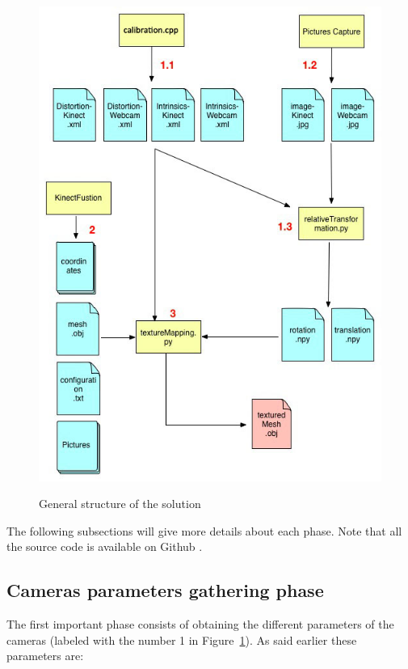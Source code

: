 \begin{figure}
\caption{General structure of the solution}
\centering
    \includegraphics[width=1.0\textwidth]{images/workflow.jpg}
\label{fig:workflow}
\end{figure}

The following subsections will give more details about each phase. Note that all the source code is available on Github \cite{github}.

\subsection{Cameras parameters gathering phase}
\label{sec:Cameras parameters gathering phase} 
The first important phase consists of obtaining the different parameters of the cameras (labeled with the number 1 in Figure~\ref{fig:workflow}). As said earlier these parameters are:\\

